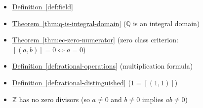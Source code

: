 \begin{dependencies}
\begin{itemize}
  \item \hyperref[def:field]{Definition~\ref*{def:field}}
  \item \hyperref[thm:q-is-integral-domain]{Theorem~\ref*{thm:q-is-integral-domain}}
        \textnormal{($\mathbb{Q}$ is an integral domain)}
  \item \hyperref[thm:ec-zero-numerator]{Theorem~\ref*{thm:ec-zero-numerator}}
        \textnormal{(zero class criterion: $[(a,b)] = 0 \Leftrightarrow a = 0$)}
  \item \hyperref[def:rational-operations]{Definition~\ref*{def:rational-operations}}
        \textnormal{(multiplication formula)}
  \item \hyperref[def:rational-distinguished]{Definition~\ref*{def:rational-distinguished}}
        \textnormal{($1 = [(1,1)]$)}
  \item $\mathbb{Z}$ has no zero divisors (so $a\neq 0$ and $b\neq 0$ implies $ab\neq 0$)
\end{itemize}
\end{dependencies}
